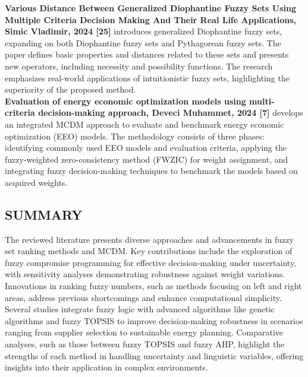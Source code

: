 \documentclass[12pt,a4paper]{article}
\begin{document}
\textbf{Various Distance Between Generalized Diophantine Fuzzy Sets Using Multiple Criteria Decision Making And Their Real Life Applications, Simic Vladimir, 2024 [25]} introduces generalized Diophantine fuzzy sets, expanding on both Diophantine fuzzy sets and Pythagorean fuzzy sets. The paper defines basic properties and distances related to these sets and presents new operators, including necessity and possibility functions. The research emphasizes real-world applications of intuitionistic fuzzy sets, highlighting the superiority of the proposed method.\\

\textbf{Evaluation of energy economic optimization models using multi-criteria decision-making approach, Deveci Muhammet, 2024 [7]} develops an integrated MCDM approach to evaluate and benchmark energy economic optimization (EEO) models. The methodology consists of three phases: identifying commonly used EEO models and evaluation criteria, applying the fuzzy-weighted zero-consistency method (FWZIC) for weight assignment, and integrating fuzzy decision-making techniques to benchmark the models based on acquired weights.


\subsection*{SUMMARY}
\hspace{2em}The reviewed literature presents diverse approaches and advancements in fuzzy set ranking methods and MCDM. Key contributions include the exploration of fuzzy compromise programming for effective decision-making under uncertainty, with sensitivity analyses demonstrating robustness against weight variations. Innovations in ranking fuzzy numbers, such as methods focusing on left and right areas, address previous shortcomings and enhance computational simplicity.\\

Several studies integrate fuzzy logic with advanced algorithms like genetic algorithms and fuzzy TOPSIS to improve decision-making robustness in scenarios ranging from supplier selection to sustainable energy planning. Comparative analyses, such as those between fuzzy TOPSIS and fuzzy AHP, highlight the strengths of each method in handling uncertainty and linguistic variables, offering insights into their application in complex environments.\\
\end{document}
